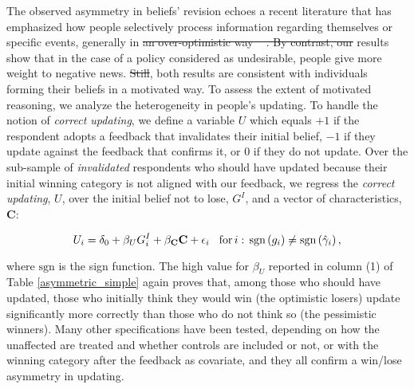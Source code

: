 \documentclass[12pt]{article} %
\providecommand{\DIFaddtex}[1]{{\protect\color{blue}\uwave{#1}}} %
\providecommand{\DIFdeltex}[1]{{\protect\color{red}\sout{#1}}}                      %
\providecommand{\DIFaddbegin}{} %
\providecommand{\DIFaddend}{} %
\providecommand{\DIFdelbegin}{} %
\providecommand{\DIFdelend}{} %
\providecommand{\DIFadd}[1]{\texorpdfstring{\DIFaddtex{#1}}{#1}} %
\providecommand{\DIFdel}[1]{\texorpdfstring{\DIFdeltex{#1}}{}} %
\newcommand{\DIFscaledelfig}{0.5}
\newlength{\DIFdelgraphicswidth} %
\newlength{\DIFdelgraphicsheight} %
\newcommand{\DIFaddincludegraphics}[2][]{{\color{blue}\fbox{\DIFOincludegraphics[#1]{#2}}}} %
\newcommand{\DIFdelincludegraphics}[2][]{%
\sbox{\DIFdelgraphicsbox}{\DIFOincludegraphics[#1]{#2}}%
\settoboxwidth{\DIFdelgraphicswidth}{\DIFdelgraphicsbox} %
\settoboxtotalheight{\DIFdelgraphicsheight}{\DIFdelgraphicsbox} %
\scalebox{\DIFscaledelfig}{%
\parbox[b]{\DIFdelgraphicswidth}{\usebox{\DIFdelgraphicsbox}\\[-\baselineskip] \rule{\DIFdelgraphicswidth}{0em}}\llap{\resizebox{\DIFdelgraphicswidth}{\DIFdelgraphicsheight}{%
\setlength{\unitlength}{\DIFdelgraphicswidth}%
\begin{picture}(1,1)%
\thicklines\linethickness{2pt} %
{\color[rgb]{1,0,0}\put(0,0){\framebox(1,1){}}}%
{\color[rgb]{1,0,0}\put(0,0){\line( 1,1){1}}}%
{\color[rgb]{1,0,0}\put(0,1){\line(1,-1){1}}}%
\end{picture}%
}\hspace*{3pt}}} %
} %
\DeclareRobustCommand{\DIFaddbegin}{\DIFOaddbegin \let\includegraphics\DIFaddincludegraphics} %
\DeclareRobustCommand{\DIFaddend}{\DIFOaddend \let\includegraphics\DIFOincludegraphics} %
\DeclareRobustCommand{\DIFdelbegin}{\DIFOdelbegin \let\includegraphics\DIFdelincludegraphics} %
\DeclareRobustCommand{\DIFdelend}{\DIFOaddend \let\includegraphics\DIFOincludegraphics} %
\begin{document}
The observed asymmetry in beliefs' revision echoes a recent literature that has emphasized how people selectively process information regarding themselves or specific events, generally in \DIFdelbegin \DIFdel{an over-optimistic way \mbox{%
\citep[][]{eil_good_2011,mobius_et_al_2011,sharot_et_al_2011}}\hspace{0pt}%
. By contrast, our }\DIFdelend \DIFaddbegin \DIFadd{a way that satisfies their ego \mbox{%
\citep[][]{eil_good_2011,mobius_et_al_2011,sharot_et_al_2011}}\hspace{0pt}%
. Our }\DIFaddend results show that in the case of a policy considered as undesirable, people give more weight to negative news. \DIFdelbegin \DIFdel{Still}\DIFdelend \DIFaddbegin \DIFadd{Thus}\DIFaddend , both results are consistent with individuals forming their beliefs in a motivated way. To assess the extent of motivated reasoning, we analyze the heterogeneity in people's updating. To handle the notion of \textit{correct updating}, we define a variable $U$ which equals $+1$ if the respondent adopts a feedback that invalidates their initial belief, $-1$ if they update against the feedback that confirms it, or $0$ if they do not update. Over the sub-sample of \textit{invalidated} respondents who should have updated because their initial winning category is not aligned with our feedback, we regress the \textit{correct updating}, $U$, over the initial belief not to lose, $G^I$, and a vector of characteristics, \textbf{C}:

\begin{equation}
	U_{i} = \delta_{0}+\beta_{U}G^I_{i}+\mathbf{\beta_C C}+\epsilon_{i}\hspace{0.3cm} \text{for}\,i:\,\text{sgn}\left(g_i\right)\neq\text{sgn}\left(\hat{\gamma}_i\right),
\end{equation}

\noindent
where $\text{sgn}$ is the sign function. The high value for $\beta_{U}$ reported in column (1) of Table \ref{asymmetric_simple} again proves that, among those who should have updated, those who initially think they would win (the optimistic losers) update significantly more correctly than those who do not think so (the pessimistic winners). Many other specifications have been tested, depending on how the unaffected are treated and whether controls are included or not, or with the winning category after the feedback as covariate, and they all confirm a win/lose asymmetry in updating.
\end{document}
